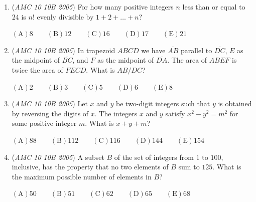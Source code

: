 \begin{enumerate}
 $\mathrm{(A)} 162 \qquad \mathrm{(B)} 180 \qquad \mathrm{(C)} 324 \qquad \mathrm{(D)} 360 \qquad \mathrm{(E)} 720$


	\item (\textit{AMC 10 10B 2005}) For how many positive integers $n$ less than or equal to $24$ is $n!$ evenly divisible by $1 + 2 + \ldots + n$?


 $\mathrm{(A)} 8 \qquad \mathrm{(B)} 12 \qquad \mathrm{(C)} 16 \qquad \mathrm{(D)} 17 \qquad \mathrm{(E)} 21$


	\item (\textit{AMC 10 10B 2005}) In trapezoid $ABCD$ we have $\overline{AB}$ parallel to $\overline{DC}$, $E$ as the midpoint of $\overline{BC}$, and $F$ as the midpoint of $\overline{DA}$. The area of $ABEF$ is twice the area of $FECD$. What is $AB/DC$?


 $\mathrm{(A)} 2 \qquad \mathrm{(B)} 3 \qquad \mathrm{(C)} 5 \qquad \mathrm{(D)} 6 \qquad \mathrm{(E)} 8$


	\item (\textit{AMC 10 10B 2005}) Let $x$ and $y$ be two-digit integers such that $y$ is obtained by reversing the digits
of $x$. The integers $x$ and $y$ satisfy $x^2 - y^2 = m^2$ for some positive integer $m$.
What is $x + y + m$?


 $\mathrm{(A)} 88 \qquad \mathrm{(B)} 112 \qquad \mathrm{(C)} 116 \qquad \mathrm{(D)} 144 \qquad \mathrm{(E)} 154$


	\item (\textit{AMC 10 10B 2005}) A subset $B$ of the set of integers from $1$ to $100$, inclusive, has the property that no two elements of $B$ sum to $125$. What is the maximum possible number of elements in $B$?


 $\mathrm{(A)} 50 \qquad \mathrm{(B)} 51 \qquad \mathrm{(C)} 62 \qquad \mathrm{(D)} 65 \qquad \mathrm{(E)} 68$


\end{enumerate}